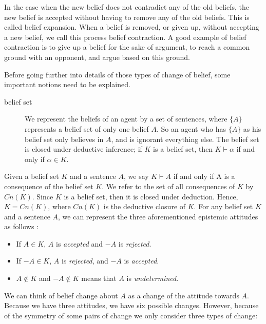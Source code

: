 \documentclass{sfuthesis}
\theoremstyle{plain}
\theoremstyle{definition}
\begin{document}
In the case when the new belief does not contradict any of the old beliefs, the new belief is accepted without having to remove any of the old beliefs. This is called belief expansion. When a belief is removed, or given up, without accepting a new belief, we call this process belief contraction. A good example of belief contraction is to give up a belief for the sake of argument, to reach a common ground with an opponent, and argue based on this ground.

Before going further into details of those types of change of belief, some important notions need to be explained.

\begin{description}
\item[belief set]

We represent the beliefs of an agent by a set of sentences, where $\{A\}$ represents a belief set of only one belief $A$. So an agent who has $\{A\}$ as his belief set only believes in $A$, and is ignorant everything else. The belief set is closed under deductive inference; if $K$ is a belief set, then $K \vdash \alpha$ if and only if $\alpha \in K$.
\end{description}

Given a belief set $K$ and a sentence $A$, we say $K \vdash A$ if and only if A is a consequence of the belief set $K$. We refer to the set of all consequences of $K$ by $Cn(K)$. Since $K$ is a belief set, then it is closed under deduction. Hence, $K = Cn(K)$, where $Cn(K)$ is the deductive closure of $K$. For any belief set $K$ and a sentence $A$, we can represent the three aforementioned epistemic attitudes as follows \cite{flux}:

\begin{itemize}
\item If $A \in K$, $A$ is \textit{accepted} and $-A$ is \textit{rejected}.

\item If $-A \in K$, $A$ is \textit{rejected}, and $-A$ is \textit{accepted}.

\item $A \notin K$ and $-A \notin K$ means that $A$ is \textit{undetermined}.
\end{itemize}

We can think of belief change about $A$ as a change of the attitude towards $A$. Because we have three attitudes, we have six possible changes. However, because of the symmetry of some pairs of change we only consider three types of change:
\end{document}
